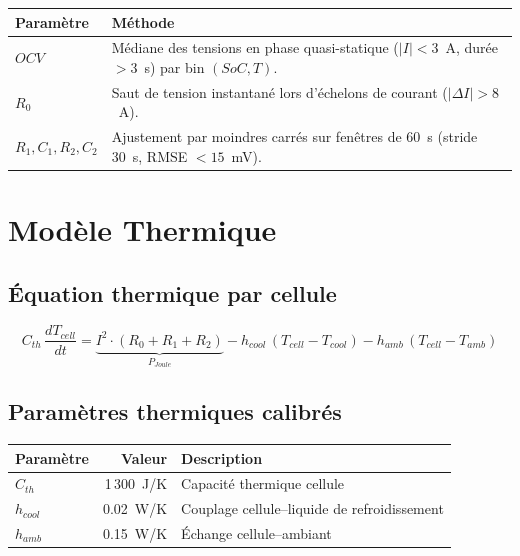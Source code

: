 \documentclass[a4paper,11pt]{article}
\begin{document}
\begin{center}
\renewcommand{\arraystretch}{1.3}
\begin{tabular}{lp{8cm}}
\toprule
\textbf{Paramètre} & \textbf{Méthode} \\
\midrule
$OCV$ & Médiane des tensions en phase quasi-statique ($|I| < 3$~A, durée $> 3$~s) par bin $(SoC, T)$. \\
$R_0$ & Saut de tension instantané lors d'échelons de courant ($|\Delta I| > 8$~A). \\
$R_1, C_1, R_2, C_2$ & Ajustement par moindres carrés sur fenêtres de 60~s (stride 30~s, RMSE $< 15$~mV). \\
\bottomrule
\end{tabular}
\end{center}

\section{Modèle Thermique}

\subsection{Équation thermique par cellule}

\[
  C_{th}\,\frac{dT_{cell}}{dt}
  = \underbrace{I^2 \cdot (R_0 + R_1 + R_2)}_{P_{Joule}}
  - h_{cool}\,(T_{cell} - T_{cool})
  - h_{amb}\,(T_{cell} - T_{amb})
\]

\subsection{Paramètres thermiques calibrés}

\begin{center}
\renewcommand{\arraystretch}{1.4}
\begin{tabular}{lrl}
\toprule
\textbf{Paramètre} & \textbf{Valeur} & \textbf{Description} \\
\midrule
$C_{th}$ & 1\,300~J/K & Capacité thermique cellule \\
$h_{cool}$ & 0.02~W/K & Couplage cellule--liquide de refroidissement \\
$h_{amb}$ & 0.15~W/K & Échange cellule--ambiant \\
\bottomrule
\end{tabular}
\end{center}
\end{document}
